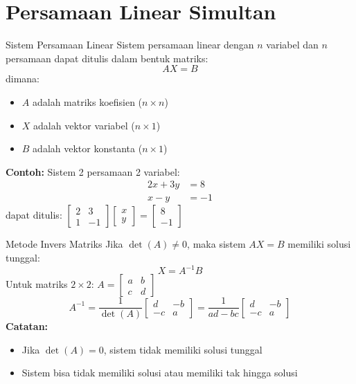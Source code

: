 \documentclass{beamer}
\begin{document}
\section{Persamaan Linear Simultan}
\begin{frame}[t,fragile]{Sistem Persamaan Linear}
Sistem persamaan linear dengan $n$ variabel dan $n$ persamaan dapat ditulis dalam bentuk matriks:
$$ AX = B $$
dimana:
\begin{itemize}
\item $A$ adalah matriks koefisien ($n \times n$)
\item $X$ adalah vektor variabel ($n \times 1$)
\item $B$ adalah vektor konstanta ($n \times 1$)
\end{itemize}
\vspace{0.3cm}
\textbf{Contoh:} Sistem 2 persamaan 2 variabel:
\begin{align*}
2x + 3y &= 8 \\
x - y &= -1
\end{align*}
dapat ditulis: $\begin{bmatrix} 2 & 3 \\ 1 & -1 \end{bmatrix} \begin{bmatrix} x \\ y \end{bmatrix} = \begin{bmatrix} 8 \\ -1 \end{bmatrix}$
\end{frame}

\begin{frame}[t,fragile]{Metode Invers Matriks}
Jika $\det(A) \neq 0$, maka sistem $AX = B$ memiliki solusi tunggal:
$$ X = A^{-1}B $$
\vspace{0.3cm}
Untuk matriks $2 \times 2$: $A = \begin{bmatrix} a & b \\ c & d \end{bmatrix}$
$$ A^{-1} = \frac{1}{\det(A)} \begin{bmatrix} d & -b \\ -c & a \end{bmatrix} = \frac{1}{ad - bc} \begin{bmatrix} d & -b \\ -c & a \end{bmatrix} $$
\vspace{0.3cm}
\textbf{Catatan:}
\begin{itemize}
\item Jika $\det(A) = 0$, sistem tidak memiliki solusi tunggal
\item Sistem bisa tidak memiliki solusi atau memiliki tak hingga solusi
\end{itemize}
\end{frame}
\end{document}
